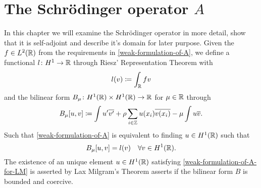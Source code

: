 \chapter{The Schrödinger operator $A$}

In this chapter we will examine the Schrödinger operator in more detail, show that it is self-adjoint and describe it's domain for later purpose. Given the $f \in L^{2}(\mathbb{R})$ from the requirements in \eqref{weak-formulation-of-A}, we define a functional $l \colon H^{1} \rightarrow \mathbb{R}$ through Riesz' Representation Theorem with
	\[ l(v) \coloneqq \int_{\mathbb{R}} f v \]
and the bilinear form $B_{\mu} \colon H^{1}(\mathbb{R}) \times H^{1}(\mathbb{R}) \rightarrow \mathbb{R}$ for $\mu \in \mathbb{R}$ through
	\[ B_{\mu}[u, v] \coloneqq \int u' \overline{v'} + \rho \sum_{i \in \mathbb{Z}} u(x_{i}) \overline{v(x_{i})} - \mu \int u \overline{v}. \]
Such that \eqref{weak-formulation-of-A} is equivalent to finding $u \in H^{1}(\mathbb{R})$ such that
	\begin{equation}
		B_{\mu}[u, v] =  l(v) \quad \forall v \in H^{1}(\mathbb{R}). \label{weak-formulation-of-A-for-LM}
	\end{equation}
The existence of an unique element $u \in H^{1}(\mathbb{R})$ satisfying \eqref{weak-formulation-of-A-for-LM} is asserted by Lax Milgram's Theorem asserts if the bilinear form $B$ is bounded and coercive.

